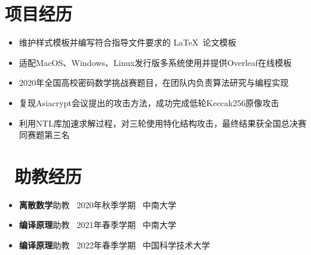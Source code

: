 \documentclass{resume}
\begin{document}
\section{\faCogs 项目经历}
\begin{itemize}
    \item 维护样式模板并编写符合指导文件要求的 \LaTeX\ 论文模板
    \item 适配MacOS、Windows、Linux发行版多系统使用并提供Overleaf在线模板
\end{itemize}

\begin{itemize}
  \item 2020年全国高校密码数学挑战赛题目，在团队内负责算法研究与编程实现
  \item 复现Asiacrypt会议提出的攻击方法，成功完成低轮Keccak256原像攻击
  \item 利用NTL库加速求解过程，对三轮使用特化结构攻击，最终结果获全国总决赛同赛题第三名
\end{itemize}


\section{\faBook\ 助教经历}
\begin{itemize}
  \item \textbf{离散数学}助教 \ 2020年秋季学期 \ 中南大学 
  \item \textbf{编译原理}助教 \ 2021年春季学期 \ 中南大学
  \item \textbf{编译原理}助教 \ 2022年春季学期 \ 中国科学技术大学
\end{itemize}
\end{document}
